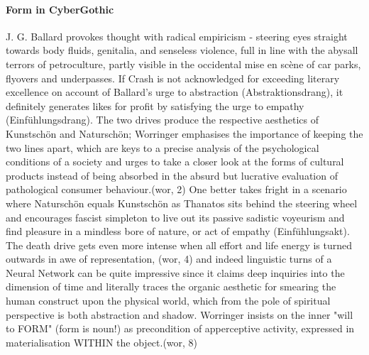 \documentclass{article}
\begin{document}
\paragraph{Form in CyberGothic} 
J. G. Ballard provokes thought with radical empiricism - 
steering eyes straight towards body fluids, genitalia, 
and senseless violence, 
full in line with the abysall terrors of petroculture, 
partly visible in the occidental mise en sc\`{e}ne 
of car parks, flyovers and underpasses.
If Crash is not acknowledged for exceeding literary excellence 
on account of Ballard's urge to abstraction (Abstraktionsdrang), 
it definitely generates likes for profit 
by satisfying the urge to empathy (Einf\"{u}hlungsdrang).
The two drives produce the respective 
aesthetics of Kunstsch\"{o}n and Natursch\"{o}n; 
Worringer emphasises the importance of 
keeping the two lines apart, which are 
keys to a precise analysis of 
the psychological conditions of a society 
and urges to take a closer look at the forms of cultural products 
instead of being absorbed in the
absurd but lucrative evaluation of pathological consumer behaviour.(wor, 2)
One better takes fright in a scenario 
where Natursch\"{o}n equals Kunstsch\"{o}n 
as Thanatos sits behind the steering wheel 
and encourages fascist simpleton 
to live out its passive sadistic voyeurism and 
find pleasure in 
a mindless bore of nature, or act of empathy (Einf\"{u}hlungsakt). 
The death drive gets even more intense when all effort and life energy
is turned outwards in awe of representation, (wor, 4) 
and indeed linguistic turns of a Neural Network can be quite impressive 
since it claims deep inquiries into the dimension of time 
and literally traces the organic aesthetic 
for smearing the human construct upon the physical world, 
which from the pole of spiritual perspective is both abstraction and shadow. 
Worringer insists on the inner "will to FORM" (form is noun!)
as precondition of apperceptive activity, 
expressed in materialisation WITHIN the object.(wor, 8)
\end{document}
